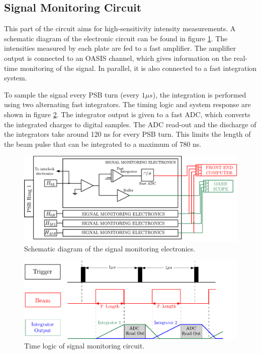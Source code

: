 \subsection{Signal Monitoring Circuit}

This part of the circuit aims for high-sensitivity intensity measurements. A schematic diagram of the electronic circuit can be found in figure \ref{fig:MonitorSchCircuit}. The intensities measured by each plate are fed to a fast amplifier. The amplifier output is connected to an OASIS channel, which gives information on the real-time monitoring of the signal. In parallel, it is also connected to a fast integration system.

To sample the signal every PSB turn (every $1 \mu s$), the integration is performed using two alternating fast integrators. The timing logic and system response are shown in figure \ref{fig:TimeResponse}. The integrator output is given to a fast ADC, which converts the integrated charges to digital samples. The ADC read-out and the discharge of the integrators take around 120 ns for every PSB turn. This limits the length of the beam pulse that can be integrated to a maximum of 780 ns.

\begin{figure}[h]
    \centering
    \includegraphics[width=1.0\columnwidth]{Figure_ElectronicSchema/SignalMonitorElec.pdf}
    \caption{Schematic diagram of the signal monitoring electronics.}
    \label{fig:MonitorSchCircuit}
\end{figure}
\begin{figure}[h]
    \centering
    \includegraphics[width=1.0\columnwidth]{Figure_ElectronicSchema/TimeSchema.pdf}
    \caption{Time logic of signal monitoring circuit.}
    \label{fig:TimeResponse}
\end{figure}

